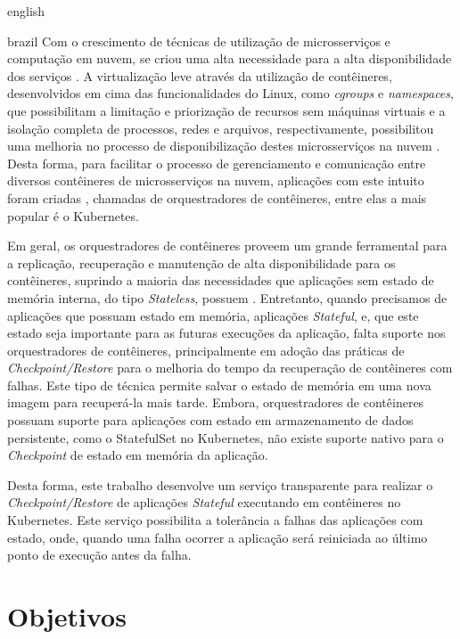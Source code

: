 \begin{otherlanguage*}{english}
\begin{otherlanguage*}{brazil}
Com o crescimento de técnicas de utilização de microsserviços e computação em
nuvem, se criou uma alta necessidade para a alta disponibilidade dos serviços
\cite{vayghan2021kubernetes}. A virtualização leve através da utilização de
contêineres, desenvolvidos em cima das funcionalidades do Linux, como \textit{cgroups}
e \textit{namespaces}, que possibilitam a limitação e priorização de recursos sem máquinas
virtuais e a isolação completa de processos, redes e arquivos, respectivamente,
possibilitou uma melhoria no processo de disponibilização destes microsserviços
na nuvem \cite{laadan2010linux}. Desta forma, para facilitar o processo de
gerenciamento e comunicação entre diversos contêineres de microsserviços na
nuvem, aplicações com este intuito foram criadas \cite{vayghan2021kubernetes},
chamadas de orquestradores de contêineres, entre elas a mais popular é
o Kubernetes\cite{kubernetes}.

Em geral, os orquestradores de contêineres proveem um grande ferramental para a
replicação, recuperação e manutenção de alta disponibilidade para os contêineres,
suprindo a maioria das necessidades que aplicações sem estado de memória interna,
do tipo \textit{Stateless}, possuem \cite{vayghan2021kubernetes}. Entretanto,
quando precisamos de aplicações que possuam estado em memória, aplicações
\textit{Stateful}, e, que este estado seja importante para as futuras execuções
da aplicação, falta suporte nos orquestradores de contêineres, principalmente em
adoção das práticas de \textit{Checkpoint/Restore} \cite{muller2022architecture}
para o melhoria do tempo da recuperação de contêineres com falhas. Este tipo de
técnica permite salvar o estado de memória em uma nova imagem para recuperá-la
mais tarde. Embora, orquestradores de contêineres possuam suporte para aplicações
com estado em armazenamento de dados persistente, como o StatefulSet no Kubernetes,
não existe suporte nativo para o \textit{Checkpoint} de estado em memória da
aplicação\cite{tran2022proactive}.

Desta forma, este trabalho desenvolve um serviço transparente para realizar o
\textit{Checkpoint/Restore} de aplicações \textit{Stateful} executando em
contêineres no Kubernetes. Este serviço possibilita a tolerância a falhas
das aplicações com estado, onde, quando uma falha ocorrer a aplicação será reiniciada
ao último ponto de execução antes da falha.

\section{Objetivos}


\end{otherlanguage*}
\end{otherlanguage*}
